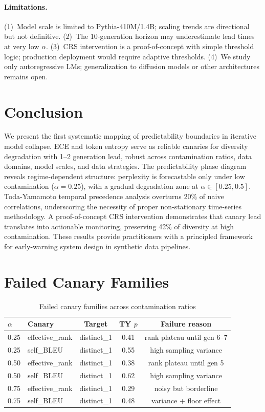 \documentclass[letterpaper]{article}
\begin{document}
\paragraph{Limitations.} (1)~Model scale is limited to Pythia-410M/1.4B; scaling trends are directional but not definitive. (2)~The 10-generation horizon may underestimate lead times at very low $\alpha$. (3)~CRS intervention is a proof-of-concept with simple threshold logic; production deployment would require adaptive thresholds. (4)~We study only autoregressive LMs; generalization to diffusion models or other architectures remains open.

\section{Conclusion}

We present the first systematic mapping of predictability boundaries in iterative model collapse. ECE and token entropy serve as reliable canaries for diversity degradation with 1--2 generation lead, robust across contamination ratios, data domains, model scales, and data strategies. The predictability phase diagram reveals regime-dependent structure: perplexity is forecastable only under low contamination ($\alpha=0.25$), with a gradual degradation zone at $\alpha \in [0.25, 0.5]$. Toda-Yamamoto temporal precedence analysis overturns 20\% of naive correlations, underscoring the necessity of proper non-stationary time-series methodology. A proof-of-concept CRS intervention demonstrates that canary lead translates into actionable monitoring, preserving 42\% of diversity at high contamination. These results provide practitioners with a principled framework for early-warning system design in synthetic data pipelines.




\appendix
\section{Failed Canary Families}

\begin{table}[h]
\centering
\caption{Failed canary families across contamination ratios}
\label{tab:failed}
\begin{tabular}{llccc}
\toprule
$\alpha$ & Canary & Target & TY $p$ & Failure reason \\
\midrule
0.25 & effective\_rank & distinct\_1 & 0.41 & rank plateau until gen 6--7 \\
0.25 & self\_BLEU & distinct\_1 & 0.55 & high sampling variance \\
0.50 & effective\_rank & distinct\_1 & 0.38 & rank plateau until gen 5 \\
0.50 & self\_BLEU & distinct\_1 & 0.62 & high sampling variance \\
0.75 & effective\_rank & distinct\_1 & 0.29 & noisy but borderline \\
0.75 & self\_BLEU & distinct\_1 & 0.48 & variance + floor effect \\
\bottomrule
\end{tabular}
\end{table}
\end{document}
